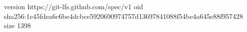 version https://git-lfs.github.com/spec/v1
oid sha256:1e45fdea6c6be4dcbce5920690974757d13697841088f54be4a645e88f957428
size 1398
